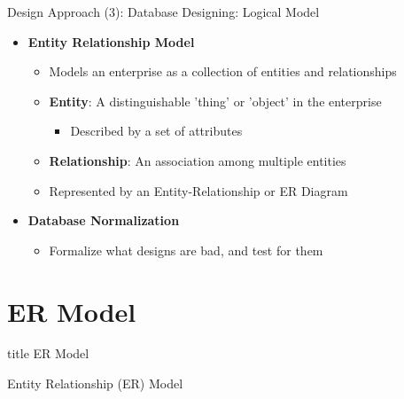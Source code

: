 \documentclass[aspectratio=169, xcolor=dvipsnames]{beamer}
\begin{document}
\begin{frame}{Design Approach (3): Database Designing: Logical Model}
    \begin{itemize}[<+->]
        \item \textbf{Entity Relationship Model}
        \begin{itemize}
            \item[$\triangleright$] Models an enterprise as a collection of entities and relationships
            \item[$\triangleright$] \textbf{Entity}: A distinguishable 'thing' or 'object' in the enterprise
            \begin{itemize}
                \item[$\circ$] Described by a set of attributes
            \end{itemize}
            \item[$\triangleright$] \textbf{Relationship}: An association among multiple entities
            \item[$\triangleright$] Represented by an Entity-Relationship or ER Diagram
        \end{itemize}
        \item \textbf{Database Normalization}
        \begin{itemize}
            \item[$\triangleright$] Formalize what designs are bad, and test for them
        \end{itemize}
    \end{itemize}
\end{frame}

\section{ER Model}
\begin{frame}
  \vfill
  \centering
  \begin{beamercolorbox}[sep=8pt,center,shadow=true,rounded=true]{title}
    ER Model\par%
  \end{beamercolorbox}
  \vfill
\end{frame}

\begin{frame}{Entity Relationship (ER) Model}
\end{frame}
\end{document}
